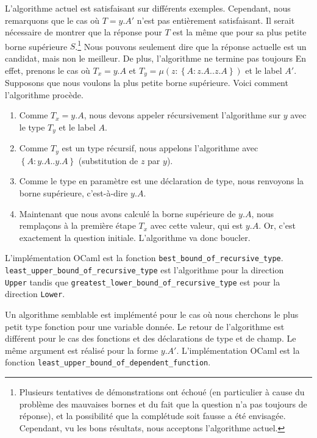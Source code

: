 
L'algorithme actuel est satisfaisant sur différents exemples. Cependant, nous
remarquons que le cas où $T = y.A'$ n'est pas entièrement satisfaisant. Il serait nécessaire de
montrer que la réponse pour $T$ est la même que pour sa plus petite borne
supérieure $S$.\footnote{Plusieurs
tentatives de démonstrations ont échoué (en particulier à cause du problème des
mauvaises bornes et du fait que la question n'a pas toujours de réponse), et la
possibilité que la complétude soit fausse a été envisagée.
Cependant, vu les bons résultats, nous acceptons l'algorithme actuel.} Nous
pouvons seulement dire que la réponse actuelle est un candidat, mais non le
meilleur.
De plus, l'algorithme ne termine pas toujours
En effet, prenons le cas où $T_{x} = y.A$ et $T_{y} = \mu(z : \left\{ A :
z.A .. z.A \right\})$ et le label $A'$. Supposons que nous voulons la plus
petite borne supérieure. Voici comment l'algorithme procède.
\begin{enumerate}
\item Comme $T_{x} = y.A$, nous devons appeler récursivement l'algorithme sur $y$
  avec le type $T_{y}$ et le label $A$.
\item Comme $T_{y}$ est un type récursif, nous appelons l'algorithme avec \\
  $\left\{ A : y.A .. y.A \right\}$ (substitution de $z$ par $y$).
\item Comme le type en paramètre est une déclaration de type, nous renvoyons la
  borne supérieure, c'est-à-dire $y.A$.
\item Maintenant que nous avons calculé la borne supérieure de $y.A$, nous
  remplaçons à la première étape $T_{x}$ avec cette valeur, qui est $y.A$. Or,
  c'est exactement la question initiale. L'algorithme va donc boucler.
\end{enumerate}

L'implémentation OCaml est la fonction \verb|best_bound_of_recursive_type|.
\verb|least_upper_bound_of_recursive_type| est l'algorithme pour la direction \\
\verb|Upper| tandis que \verb|greatest_lower_bound_of_recursive_type| est pour
la direction \verb|Lower|.

Un algorithme semblable est implémenté pour le cas où nous cherchons le plus
petit type fonction pour une variable donnée. Le retour de l'algorithme est
différent pour le cas des fonctions et des déclarations de type et de champ. Le
même argument est réalisé pour la forme $y.A'$.
L'implémentation OCaml est la fonction \verb|least_upper_bound_of_dependent_function|.

